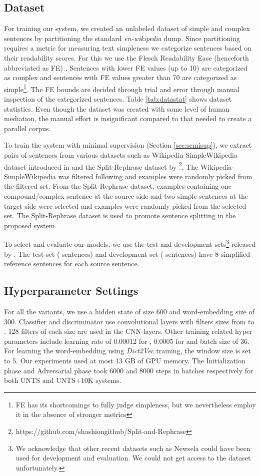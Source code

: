 \documentclass[11pt,a4paper]{article}
\begin{document}
\subsection{Dataset}
\label{subsec:dataset}
For training our system, we created an unlabeled dataset of simple and complex sentences by partitioning the standard \textit{en-wikipedia} dump. Since partitioning requires a metric for measuring text simpleness we categorize sentences based on their readability scores. For this we use the Flesch Readability Ease (henceforth abbreviated as FE) \cite{flesch1948new}. Sentences with lower FE values (up to 10) are categorized as complex and sentences with FE values greater than 70 are categorized as simple\footnote{FE has its shortcomings to fully judge simpleness, but we nevertheless employ it in the absence of stronger metrics}. The FE bounds are decided through trial and error through manual inspection of the categorized sentences. Table \ref{tab:datastat} shows dataset statistics. Even though the dataset was created with some level of human mediation, the manual effort is insignificant compared to that needed to create a parallel  corpus. 

To train the system with minimal supervision (Section \ref{sec:semisup}), we extract  pairs of sentences from various datasets such as Wikipedia-SimpleWikipedia dataset introduced in  and the Split-Rephrase dataset by \footnote{https://github.com/shashiongithub/Split-and-Rephrase}. The Wikipedia-SimpleWikipedia was filtered following  and  examples were randomly picked from the filtered set. From the Split-Rephrase dataset, examples containing one compound/complex sentence at the source side and two simple sentences at the target side were selected and  examples were randomly picked from the selected set. The Split-Rephrase dataset is used to promote sentence splitting in the proposed system.

To select and evaluate our models, we use the test and development sets\footnote{We acknowledge that other recent datasets such as Newsela could have been used for development and evaluation. We could not get access to the dataset unfortunately.} released by \cite{xu2016optimizing}. The test set ( sentences) and development set ( sentences) have 8 simplified reference sentences for each source sentence. 

\subsection{Hyperparameter Settings}
\label{subsec:param}
For all the variants, we use a hidden state of size 600 and word-embedding size of 300. Classifier  and discriminator  use convolutional layers with filters sizes from  to . 128 filters of each size are used in the CNN-layers. Other training related hyper parameters include learning rate of 0.00012 for  , 0.0005 for  and batch size of 36. For learning the word-embedding using \textit{Dict2Vec} training, the window size is set to 5. Our experiments used at most 13 GB of GPU memory. The Initialization phase and Adversarial phase took 6000 and 8000 steps in batches respectively for both \textsc{UNTS} and \textsc{UNTS}+10K systems.
\end{document}
